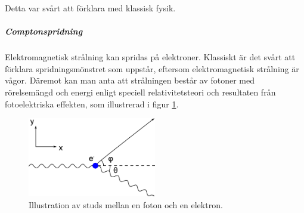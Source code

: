Detta var svårt att förklara med klassisk fysik.

\subparagraph{Comptonspridning}
Elektromagnetisk strålning kan spridas på elektroner. Klassiskt är det svårt att förklara spridningsmönstret som uppstår, eftersom elektromagnetisk strålning är vågor. Däremot kan man anta att strålningen består av fotoner med rörelsemängd och energi enligt speciell relativitetsteori och resultaten från fotoelektriska effekten, som illustrerad i figur \ref{fig:compton_collision}.

\begin{figure}[!ht]
	\centering
	\includegraphics[width = 0.5\textwidth]{./Images/compton_collision.eps}
	\caption{Illustration av studs mellan en foton och en elektron.}
	\label{fig:compton_collision}
\end{figure}

